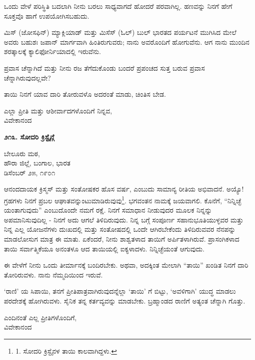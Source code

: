 ಒಂದು ವೇಳೆ ಪರಿಸ್ಥಿತಿ ಬದಲಾಗಿ ನೀನು ಬರಲು ಸಾಧ್ಯವಾಗದೆ ಹೋದರೆ ಪರವಾಗಿಲ್ಲ. ಹಣವನ್ನು ನಿನಗೆ ಹೇಗೆ ಸೂಕ್ತವೊ ಹಾಗೆ ಉಪಯೋಗಿಸಬಹುದು.

ಮಿಸ್ (ಜೋಸಫಿನ್) ಮ್ಯಾಕ್ಲಿಯಾಡ್ ಮತ್ತು ಮಿಸೆಸ್ (ಓಲ್) ಬುಲ್ ಭಾರತದ ಪರ್ಯಟನೆ ಮುಗಿಸಿದ ಮೇಲೆ ಅವರು ಬಹುಶಃ ಜಪಾನ್ ಮಾರ್ಗವಾಗಿ ಹಿಂತಿರುಗುವರು; ನಾನು ಅವರೊಂದಿಗೆ ಹೋಗುವೆನು. ಆಗ ನಾನು ಮುಂದಿನ ಶರತ್ಕಾಲಕ್ಕೆ ಕ್ಯಾಲಿಫೋರ್ನಿಯಾದಲ್ಲಿ ಇರುವೆನು.

ಪ್ರವಾಸ ಚೆನ್ನಾಗಿದೆ ಮತ್ತು ನೀನು ರಜ ತೆಗೆದುಕೊಂಡು ಬಂದರೆ ಪ್ರಪಂಚದ ಸುತ್ತ ಬರುವ ಪ್ರವಾಸ ಚೆನ್ನಾಗಿರುವುದಲ್ಲವೇ?

ತಾಯಿ ನಿನಗೆ ಯಾವ ದಾರಿ ತೋರುವಳೊ ಅದರಂತೆ ಮಾಡು, ಚಿಂತಿಸ ಬೇಡ.

\begin{center}
ಎಲ್ಲಾ ಪ್ರೀತಿ ಮತ್ತು ಆಶೀರ್ವಾದಗಳೊಂದಿಗೆ ನಿನ್ನವ,\\ವಿವೇಕಾನಂದ
\end{center}

\begin{center}
\textbf{೨೧೩. ಸೋದರಿ ಕ್ರಿಸ್ಟೈನ್ಗೆ}
\end{center}

\begin{flushright}
ಬೇಲೂರು ಮಠ,\\ಹೌರಾ ಜಿಲ್ಲೆ, ಬಂಗಾಲ, ಭಾರತ\\ಡಿಸೆಂಬರ್ ೨೫, ೧೯೦೧
\end{flushright}

ಆನಂದದಾಯಕ ಕ್ರಿಸ್ಮಸ್ ಮತ್ತು ಸಂತೋಷಕರ ಹೊಸ ವರ್ಷ, ಎಂಬುದು ಸಾಮಾನ್ಯ ರೀತಿಯ ಅಭಿವಾದನೆ. ಅಯ್ಯೊ! ಗ್ರಹಗಳು ನಿನಗೆ ಪ್ರಬಲ ಆಘಾತವನ್ನುಂಟುಮಾಡಿರುವುವು\footnote{1. ಸೋದರಿ ಕ್ರಿಸ್ಟೈನಳ ತಾಯಿ ಕಾಲವಾಗಿದ್ದಳು.}. ಭಗವಂತನ ನಾಮಕ್ಕೆ ಜಯವಾಗಲಿ. ಕೊನೆಗೆ, “ನಿನ್ನಿಚ್ಛೆ ಯಂತಾಗುವುದು” ಎಂಬುದೊಂದೇ ನಮಗೆ ರಕ್ಷೆ. ನಿನಗೆ ಸಮಾಧಾನ ನೀಡುವುದರ ಮೂಲಕ ನಿನ್ನನ್ನು ಅಪಮಾನಿಸುವುದಿಲ್ಲ - ನಿನಗೆ ಅದು ಆಗಲೆ ತಿಳಿದಿರುವುದು. ನಿನ್ನ ಬಗ್ಗೆ ಸಂಪೂರ್ಣ ಸಹಾನುಭೂತಿಯುಳ್ಳವರ ಮತ್ತು ನಿನ್ನ ಎಲ್ಲ ಯೋಜನೆಗಳು ದುಃಖದಲ್ಲಿ ಮತ್ತು ಸಂತೋಷದಲ್ಲಿ ಒಂದೇ ಆಗಿರಬೇಕೆಂದು ತಿಳಿದಿರುವವರ ನೆನಪನ್ನು ಮಾಡಲೋಸುಗ ಮಾತ್ರ ಈ ಮಾತು. ಏಕೆಂದರೆ, ನೀನು ಶಾಶ್ವತಳಾದ ತಾಯಿಗೆ ಅರ್ಪಿತಳಾಗಿರುವೆ. ಪ್ರಾಸಂಗಿಕಳಾದ ತಾಯಿ ಸರ್ವಾತ್ಮಿಕೆಯೂ ಅನಂತಳೂ ಆದ ತಾಯಿಯಲ್ಲಿ ಐಕ್ಯಳಾದಳು. ನಿನ್ನಿಚ್ಛೆಯಂತೆ ಆಗುವುದು.

ಈ ವೇಳೆಗೆ ನೀನು ಒಂದು ತೀರ್ಮಾನಕ್ಕೆ ಬಂದಿರಬೇಕು. ಅಥವಾ, ಅದಕ್ಕಿಂತ ಮೇಲಾಗಿ “ತಾಯಿ” ಖಂಡಿತ ನಿನಗೆ ದಾರಿ ತೋರಿರುವಳು. ನಾನು ನೆಮ್ಮದಿಯಿಂದ ಇರುವೆ.

‘ರಾಣಿ’ ಯ ಸಿಪಾಯಿ, ತನಗೆ ಪ್ರೀತಿಪಾತ್ರವಾಗಿರುವುದನ್ನೆಲ್ಲಾ ‘ತಾಯಿ’ ಗೆ ಬಿಟ್ಟು, ‘ಅವಳಿಗಾಗಿ’ ಯುದ್ಧ ಮಾಡಲು ಪರದೇಶಕ್ಕೆ ಹೋಗಿರುವಳು. ಸೈನಿಕ ತನ್ನ ಕರ್ತವ್ಯವನ್ನು ಮಾಡಬೇಕು. ಬ್ರಹ್ಮಾಂಡದ ರಾಣಿಗೆ ಅತ್ಯಂತ ಚೆನ್ನಾಗಿ ಗೊತ್ತು.

\begin{flushright}
ಎಂದಿನಂತೆ ಎಲ್ಲ ಪ್ರೀತಿಗಳೊಂದಿಗೆ,\\ವಿವೇಕಾನಂದ
\end{flushright}

